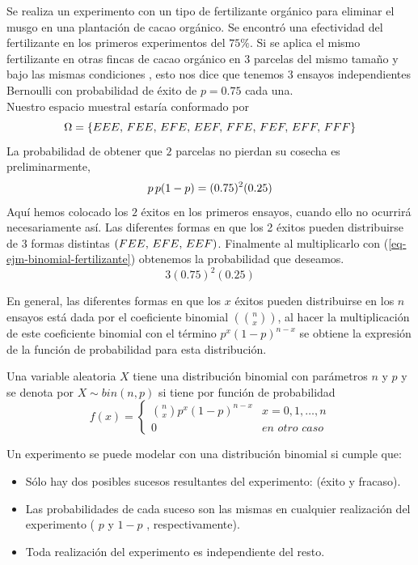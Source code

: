 \begin{Ejm}
    Se realiza un experimento con un tipo de fertilizante orgánico para eliminar el musgo en una plantación de cacao orgánico. Se encontró una efectividad del fertilizante en los primeros experimentos del $75\%$.
    Si se aplica el mismo fertilizante en otras fincas de cacao orgánico en $3$ parcelas del mismo tamaño y bajo las mismas condiciones , esto nos dice que tenemos $3$ ensayos independientes Bernoulli con probabilidad de éxito de $p=0.75$  cada una.\\
    Nuestro espacio muestral estaría conformado por $$\Omega= \{EEE,\thinspace FEE,\thinspace EFE,\thinspace EEF,\thinspace FFE,\thinspace FEF,\thinspace EFF,\thinspace FFF\}$$
    La probabilidad de obtener que $2$ parcelas no pierdan su cosecha es preliminarmente,
    \begin{eqnarray}
        \label{eq-ejm-binomial-fertilizante}
    	p\thinspace p (1-p)=(0.75)^2(0.25)
    \end{eqnarray}
    Aquí hemos colocado los $2$ éxitos en los primeros ensayos, cuando ello no ocurrirá necesariamente así. Las diferentes formas en que los 2 éxitos pueden distribuirse de $3$ formas distintas $(FEE,\thinspace EFE,\thinspace EEF)$. Finalmente al multiplicarlo con (\ref{eq-ejm-binomial-fertilizante}) obtenemos la probabilidad que deseamos. $$3(0.75)^2(0.25)$$
\end{Ejm}
En general, las diferentes formas en que los $x$ éxitos pueden distribuirse en los $n$ ensayos está dada por el coeficiente binomial $(n\choose x)$,  al hacer la multiplicación de este coeficiente binomial con el término $p^x(1-p)^{n-x}$ se obtiene la expresión de la función de probabilidad para esta distribución.
\begin{Def}
    Una variable aleatoria $X$ tiene una distribución binomial con parámetros $n$ y $p$ y se denota por $X\sim bin(n,p)$ si tiene por función de probabilidad
    $$f(x)=
    \begin{cases}
        {n \choose x} p^x(1-p)^{n-x}& x=0,1,\ldots,n\\0 & \textit{en otro caso}
    \end{cases}$$
\end{Def}
Un experimento se puede modelar con una distribución binomial si cumple que:
\begin{itemize}
    \item Sólo hay dos posibles sucesos resultantes del experimento:
    (éxito y fracaso).
    \item Las probabilidades de cada suceso son las mismas en cualquier realización del experimento ( $p$ y $1-p$ , respectivamente).
    \item Toda realización del experimento es independiente del resto.
\end{itemize}

